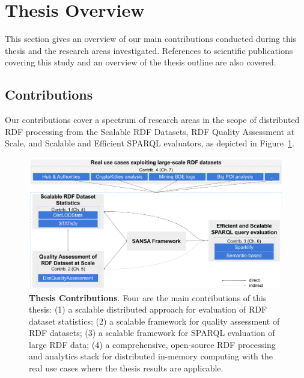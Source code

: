 \section{Thesis Overview}
\label{sec:thesis-overview}
This section gives an overview of our main contributions conducted during this thesis and the research areas investigated.
References to scientific publications covering this study and an overview of the thesis outline are also covered.

\subsection{Contributions}
Our contributions cover a spectrum of research areas in the scope of distributed \gls{RDF} processing from the Scalable \gls{RDF} Datasets, \gls{RDF} Quality Assessment at Scale, and Scalable and Efficient \gls{SPARQL} evaluators, as depicted in Figure~\ref{fig:thesis-contributions}.

\begin{figure}
\centering
\includegraphics[width=1.0\columnwidth]{images/1_introduction/thesis-contributions.pdf}
\caption{\textbf{Thesis Contributions}. Four are the main contributions of this thesis: (1) a scalable distributed approach for evaluation of RDF dataset statistics; (2) a scalable framework for quality assessment of RDF datasets; (3) a scalable framework for SPARQL evaluation of large RDF data; (4) a comprehensive, open-source RDF processing and analytics stack for distributed in-memory computing with the real use cases where the thesis results are applicable.}
\label{fig:thesis-contributions}
\end{figure}

